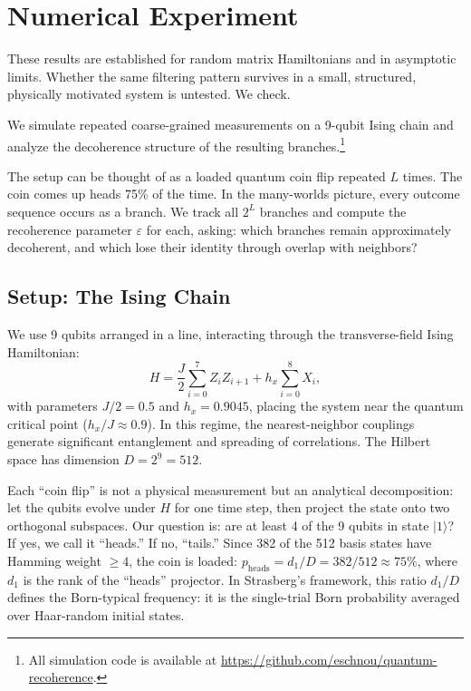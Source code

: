 \documentclass[aps,prd,twocolumn,showpacs,preprintnumbers,amsmath,amssymb,nofootinbib]{revtex4-2}
\begin{document}
\section{Numerical Experiment}
\label{sec:experiment}

These results are established for random matrix Hamiltonians and in asymptotic
limits.  Whether the same filtering pattern survives in a small, structured,
physically motivated system is untested.  We check.

We simulate repeated coarse-grained measurements on a 9-qubit Ising chain and
analyze the decoherence structure of the resulting
branches.\footnote{All simulation code is available at
\url{https://github.com/eschnou/quantum-recoherence}.}

The setup can be thought of as a loaded quantum coin flip repeated $L$ times.
The coin comes up heads 75\% of the time. In the many-worlds picture, every
outcome sequence occurs as a branch. We track all $2^L$ branches and compute the
recoherence parameter $\varepsilon$ for each, asking: which branches remain
approximately decoherent, and which lose their identity through overlap with
neighbors?

\subsection{Setup: The Ising Chain}
\label{sec:setup}

We use 9 qubits arranged in a line, interacting through the transverse-field Ising
Hamiltonian:
\begin{equation}
  H = \frac{J}{2} \sum_{i=0}^{7} Z_i Z_{i+1}
    + h_x \sum_{i=0}^{8} X_i,
\end{equation}
with parameters $J/2 = 0.5$ and $h_x = 0.9045$, placing the system near the
quantum critical point ($h_x/J \approx 0.9$). In this regime, the nearest-neighbor
couplings generate significant entanglement and spreading of correlations. The
Hilbert space has dimension $D = 2^9 = 512$.

Each ``coin flip'' is not a physical measurement but an analytical decomposition:
let the qubits evolve under $H$ for one time step, then project the state onto
two orthogonal subspaces. Our question is: are at least
4 of the 9 qubits in state $|1\rangle$? If yes, we call it ``heads.'' If no,
``tails.'' Since 382 of the 512 basis states have Hamming weight $\geq 4$, the
coin is loaded: $p_\text{heads} = d_1/D = 382/512 \approx 75\%$, where $d_1$ is
the rank of the ``heads'' projector. In Strasberg's framework, this ratio $d_1/D$
defines the Born-typical frequency: it is the single-trial Born probability
averaged over Haar-random initial states.
\end{document}
